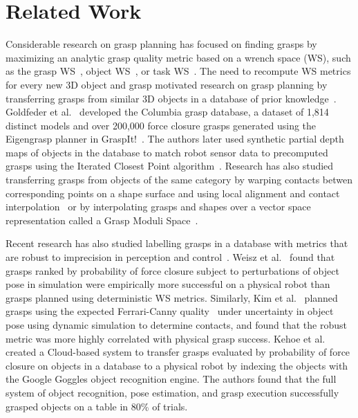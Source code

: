 \section{Related Work}

Considerable research on grasp planning has focused on finding grasps by maximizing an analytic grasp quality metric based on a wrench space (WS), such as the grasp WS~\cite{ferrari1992, ciocarlie2009}, object WS~\cite{liu2015fast}, or task WS~\cite{kruger2011partial}.
The need to recompute WS metrics for every new 3D object and grasp motivated research on grasp planning by transferring grasps from similar 3D objects in a database of prior knowledge~\cite{li2005shape}.
Goldfeder et al.~\cite{goldfeder2009columbia} developed the Columbia grasp database, a dataset of 1,814 distinct models and over 200,000 force closure grasps generated using the Eigengrasp planner in GraspIt!~\cite{ciocarlie2009}.
The authors later used synthetic partial depth maps of objects in the database to match robot sensor data to precomputed grasps using the Iterated Closest Point algorithm~\cite{goldfeder2011data}.
Research has also studied transferring grasps from objects of the same category by warping contacts betwen corresponding points on a shape surface and using local alignment and contact interpolation~\cite{stouraitis2015functional} or by interpolating grasps and shapes over a vector space representation called a Grasp Moduli Space~\cite{pokorny2013grasp}.

Recent research has also studied labelling grasps in a database with metrics that are robust to imprecision in perception and control~\cite{brook2011collaborative}.
Weisz et al.~\cite{weisz2012pose} found that grasps ranked by probability of force closure subject to perturbations of object pose in simulation were empirically more successful on a physical robot than grasps planned using deterministic WS metrics. 
Similarly, Kim et al.~\cite{kim2012physically} planned grasps using the expected Ferrari-Canny quality~\cite{ferrari1992} under uncertainty in object pose using dynamic simulation to determine contacts, and found that the robust metric was more highly correlated with physical grasp success.
Kehoe et al.~\cite{kehoe2013cloud} created a Cloud-based system to transfer grasps evaluated by probability of force closure on objects in a database to a physical robot by indexing the objects with the Google Goggles object recognition engine.
The authors found that the full system of object recognition, pose estimation, and grasp execution successfully grasped objects on a table in 80\% of trials.

